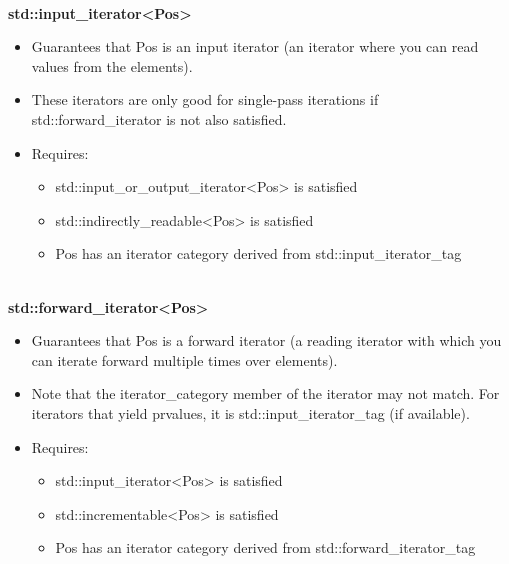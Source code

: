 \noindent
\hspace*{\fill} \\ %
\textbf{std::input\_iterator<Pos>}

\begin{itemize}
\item
Guarantees that Pos is an input iterator (an iterator where you can read values from the elements).

\item
These iterators are only good for single-pass iterations if std::forward\_iterator is not also satisfied.

\item
Requires:
\begin{itemize}
\item
std::input\_or\_output\_iterator<Pos> is satisfied

\item
std::indirectly\_readable<Pos> is satisfied

\item
Pos has an iterator category derived from std::input\_iterator\_tag
\end{itemize}
\end{itemize}


\noindent
\hspace*{\fill} \\ %
\textbf{std::forward\_iterator<Pos>}

\begin{itemize}
\item
Guarantees that Pos is a forward iterator (a reading iterator with which you can iterate forward multiple times over elements).

\item
Note that the iterator\_category member of the iterator may not match. For iterators that yield prvalues, it is std::input\_iterator\_tag (if available).

\item
Requires:
\begin{itemize}
\item
std::input\_iterator<Pos> is satisfied

\item
std::incrementable<Pos> is satisfied

\item
Pos has an iterator category derived from std::forward\_iterator\_tag
\end{itemize}
\end{itemize}

